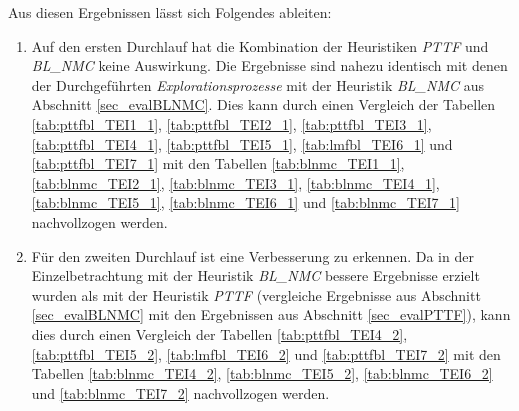 \begin{multicols}{2}
\columnbreak
{}
\end{multicols}

\begin{multicols}{2}
\columnbreak
{}
\end{multicols}

\begin{multicols}{2}
\columnbreak
{}
\end{multicols}

\begin{multicols}{2}
\columnbreak
{}
\end{multicols}
\pagebreak
\noindent
Aus diesen Ergebnissen lässt sich Folgendes ableiten:
\begin{enumerate}
\item Auf den ersten Durchlauf hat die Kombination der \Gls{Heuristik}en \emph{PTTF} und \emph{BL\_NMC} keine Auswirkung. Die Ergebnisse sind nahezu identisch mit denen der Durchgeführten \emph{Explorationsprozesse} mit der \Gls{Heuristik} \emph{BL\_NMC} aus Abschnitt \ref{sec_evalBLNMC}. Dies kann durch einen Vergleich der Tabellen \ref{tab:pttfbl_TEI1_1}, \ref{tab:pttfbl_TEI2_1}, \ref{tab:pttfbl_TEI3_1}, \ref{tab:pttfbl_TEI4_1}, \ref{tab:pttfbl_TEI5_1}, \ref{tab:lmfbl_TEI6_1} und  \ref{tab:pttfbl_TEI7_1} mit den Tabellen \ref{tab:blnmc_TEI1_1}, \ref{tab:blnmc_TEI2_1}, \ref{tab:blnmc_TEI3_1}, \ref{tab:blnmc_TEI4_1}, \ref{tab:blnmc_TEI5_1}, \ref{tab:blnmc_TEI6_1} und \ref{tab:blnmc_TEI7_1} nachvollzogen werden.

\item Für den zweiten Durchlauf ist eine Verbesserung  zu erkennen. Da in der Einzelbetrachtung mit der \Gls{Heuristik} \emph{BL\_NMC} bessere Ergebnisse erzielt wurden als mit der \Gls{Heuristik} \emph{PTTF} (vergleiche Ergebnisse aus Abschnitt \ref{sec_evalBLNMC} mit den Ergebnissen aus Abschnitt \ref{sec_evalPTTF}), kann dies durch einen Vergleich der Tabellen \ref{tab:pttfbl_TEI4_2}, \ref{tab:pttfbl_TEI5_2}, \ref{tab:lmfbl_TEI6_2} und  \ref{tab:pttfbl_TEI7_2} mit den Tabellen \ref{tab:blnmc_TEI4_2}, \ref{tab:blnmc_TEI5_2}, \ref{tab:blnmc_TEI6_2} und \ref{tab:blnmc_TEI7_2} nachvollzogen werden.
\end{enumerate}



